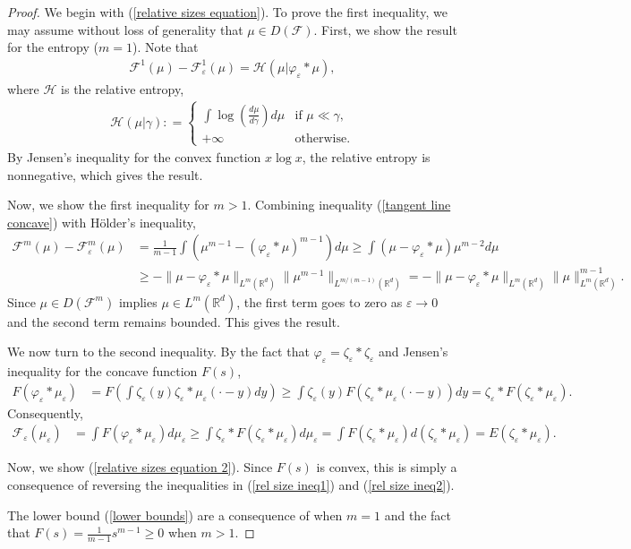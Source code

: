 \documentclass[11pt,leqno]{amsart}
\theoremstyle{definition}
\newcommand{\Rd}{{\mathord{\mathbb R}^d}}
\newcommand{\F}{\mathcal{F}}
\def\e{\varepsilon}
\def\F{\mathcal{F}}
\begin{document}
\begin{proof}
We begin with (\ref{relative sizes equation}). To prove the first inequality, we may assume without loss of generality that $\mu \in D(\F)$.
First, we show the result for the entropy ($m=1$). Note that
\begin{align} \label{relative entropy relation} \F^1(\mu)-\F^1_\e(\mu) =  \mathcal{H}(\mu | \varphi_\e *\mu) ,\end{align} where $\mathcal{H}$ is the relative entropy,
\begin{align*}
 \mathcal{H}(\mu | \gamma) : = \begin{cases} \int \log \left( \frac{d \mu}{d \gamma} \right) d \mu &\text{if } \mu \ll \gamma, \\ + \infty &\text{otherwise.}\end{cases}
\end{align*}
By Jensen's inequality for the convex function $x \log x$,  the relative entropy
is nonnegative, which gives the result.

Now, we show the first inequality for $m>1$. Combining inequality (\ref{tangent line  concave}) with H\"older's inequality,
\begin{align*}
\F^m(\mu) - \F^m_\e(\mu) &= \frac{1}{m-1} \int \left( \mu^{m-1} - (\varphi_\e*\mu)^{m-1} \right) d \mu \geq \int \left(\mu - \varphi_\e*\mu \right) \mu^{m-2} d \mu 
\\ 
&\geq - \|\mu - \varphi_\e* \mu\|_{L^m(\Rd)} \|\mu^{m-1}\|_{L^{m/(m-1)}(\Rd)} = - \|\mu - \varphi_\e* \mu\|_{L^m(\Rd)} \|\mu\|_{L^m(\Rd)}^{m-1} .
\end{align*}
Since $\mu \in D(\F^m)$ implies $\mu \in L^m(\Rd)$, the first term goes to zero as $\e \to 0$ and the second term remains bounded. This gives the result.


We now turn to the second inequality. By the fact that $\varphi_\e = \zeta_\e * \zeta_\e$ and Jensen's inequality for the concave function $F(s)$,
\begin{align} \label{rel size ineq1}
 F(\varphi_\e * \mu_\e) &= 
 F \left( \int \zeta_\e(y) \zeta_\e*\mu_\e(\cdot-y) dy \right)  \geq   \int \zeta_\e(y) F \left(\zeta_\e*\mu_\e(\cdot-y) \right) dy   =   \zeta_\e* F \left(\zeta_\e*\mu_\e \right).
\end{align}
Consequently,
\begin{align} \label{rel size ineq2}
\F_\e(\mu_\e) &= \int F(\varphi_\e * \mu_\e) d \mu_\e \geq   \int \zeta_\e*  F \left(\zeta_\e*\mu_\e \right)  d \mu_\e  = \int   F \left(\zeta_\e*\mu_\e \right)  d (\zeta_\e*\mu_\e) = E \left( \zeta_\e*\mu_\e  \right) .
\end{align}

Now, we show (\ref{relative sizes equation 2}). Since $F(s)$ is convex, this is simply a consequence of reversing the inequalities in (\ref{rel size ineq1}) and (\ref{rel size ineq2}).

The lower bound (\ref{lower bounds}) are a consequence of \cite[Lemma 4.1]{CPSW} when $m =1$ and the fact that $F(s) = \frac{1}{m-1}s^{m-1} \geq 0$ when $m >1$.
\end{proof}
\end{document}
